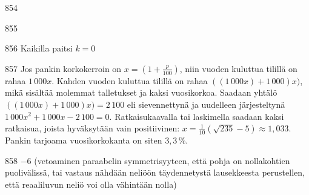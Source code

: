 \begin{Vastaus}{854}
	
\end{Vastaus}
\begin{Vastaus}{855}
		
\end{Vastaus}
\begin{Vastaus}{856}
Kaikilla paitsi $k=0$
	
\end{Vastaus}
\begin{Vastaus}{857}
	Jos pankin korkokerroin on $x=(1+\frac{p}{100})$, niin vuoden kuluttua tilillä on rahaa $1\,000x$. Kahden vuoden kuluttua tilillä on rahaa $((1\,000x)+1\,000)x)$, mikä sisältää molemmat talletukset ja kaksi vuosikorkoa. Saadaan yhtälö $((1\,000x)+1\,000)x)=2\,100$ eli sievennettynä ja uudelleen järjesteltynä $1\,000x^2+1\,000x-2\,100=0$. Ratkaisukaavalla tai laskimella saadaan kaksi ratkaisua, joista hyväksytään vain positiivinen: $x=\frac{1}{10}(\sqrt{235}-5)\approx1,033$. Pankin tarjoama vuosikorkokanta on siten $3,3$\,\%.
	
\end{Vastaus}
\begin{Vastaus}{858}
	$-6$ (vetoaminen paraabelin symmetrisyyteen, että pohja on nollakohtien puolivälissä, tai vastaus nähdään neliöön täydennetystä lausekkeesta perustellen, että reaaliluvun neliö voi olla vähintään nolla)
	
\end{Vastaus}
